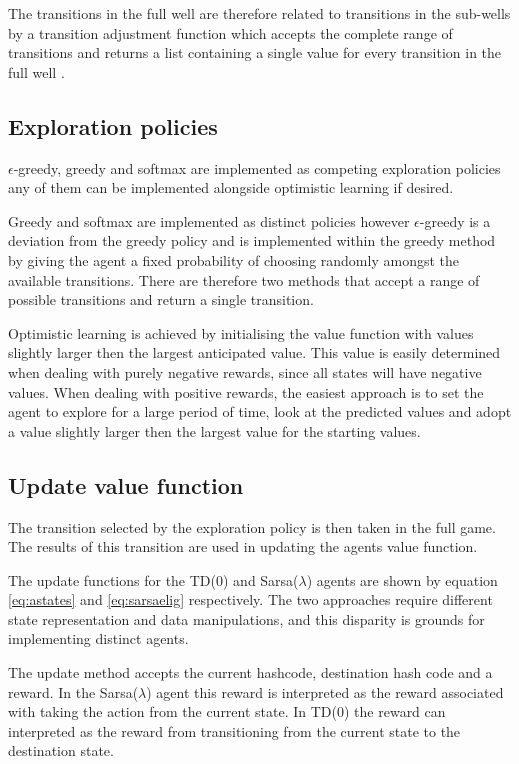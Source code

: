 \documentclass{rucsthesis}
\begin{document}
The transitions in the full well are therefore related to transitions in the sub-wells by a transition adjustment function which accepts the complete range of transitions and returns a list containing a single value for every transition in the full well .

\subsection{Exploration policies}

$\epsilon$-greedy, greedy and softmax are implemented as competing exploration policies any of them can be implemented alongside optimistic learning if desired.

Greedy and softmax are implemented as distinct policies however $\epsilon$-greedy is a deviation from the greedy policy and is implemented within the greedy method by giving the agent a fixed probability of choosing randomly amongst the available transitions. There are therefore two methods that accept a range of possible transitions and return a single transition.

Optimistic learning is achieved by initialising the value function with values slightly larger then the largest anticipated value. This value is easily determined when dealing with purely negative rewards, since all states will have negative values. When dealing with positive rewards, the easiest approach is to set the agent to explore for a large period of time, look at the predicted values and adopt a value slightly larger then the largest value for the starting values.

\subsection{Update value function}

The transition selected by the exploration policy is then taken in the full game. The results of this transition are used in updating the agents value function.

The update functions for the TD(0) and Sarsa($\lambda$) agents are shown by equation \ref{eq:astates} and \ref{eq:sarsaelig} respectively. The two approaches require different state representation and data manipulations, and this disparity is grounds for implementing distinct agents. 

The update method accepts the current hashcode, destination hash code and a reward. In the Sarsa($\lambda$) agent this reward is interpreted as the reward associated with taking the action from the current state. In TD(0) the reward can interpreted as the reward from transitioning from the current state to the destination state.
\end{document}
